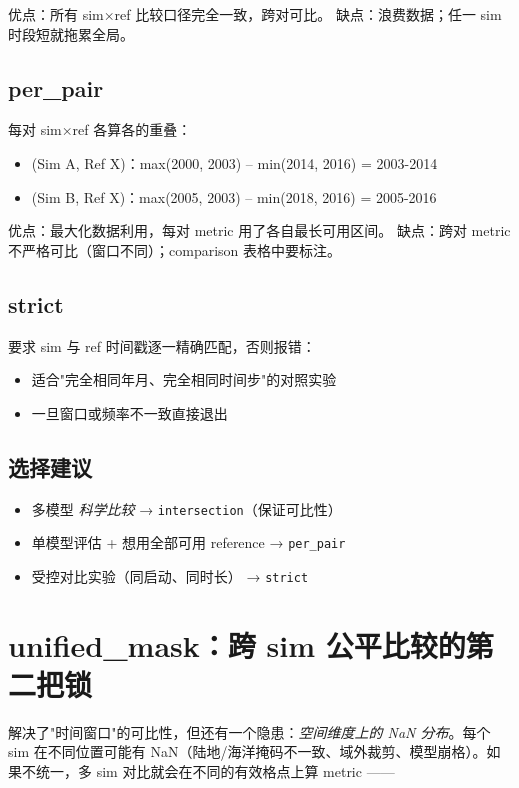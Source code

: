 优点：所有 sim×ref 比较口径完全一致，跨对可比。
缺点：浪费数据；任一 sim 时段短就拖累全局。

\subsection{per\_pair}

每对 sim×ref 各算各的重叠：

\begin{itemize}
  \item (Sim A, Ref X)：max(2000, 2003) -- min(2014, 2016) = 2003-2014
  \item (Sim B, Ref X)：max(2005, 2003) -- min(2018, 2016) = 2005-2016
\end{itemize}

优点：最大化数据利用，每对 metric 用了各自最长可用区间。
缺点：跨对 metric 不严格可比（窗口不同）；comparison 表格中要标注。

\subsection{strict}

要求 sim 与 ref 时间戳逐一精确匹配，否则报错：

\begin{itemize}
  \item 适合"完全相同年月、完全相同时间步"的对照实验
  \item 一旦窗口或频率不一致直接退出
\end{itemize}

\subsection{选择建议}

\begin{itemize}
  \item 多模型 \emph{科学比较} → \texttt{intersection}（保证可比性）
  \item 单模型评估 + 想用全部可用 reference → \texttt{per_pair}
  \item 受控对比实验（同启动、同时长） → \texttt{strict}
\end{itemize}

\section{unified\_mask：跨 sim 公平比较的第二把锁}

 解决了"时间窗口"的可比性，但还有一个隐患：\emph{空间维度上的 NaN 分布}。每个 sim 在不同位置可能有 NaN（陆地/海洋掩码不一致、域外裁剪、模型崩格）。如果不统一，多 sim 对比就会在不同的有效格点上算 metric ——

